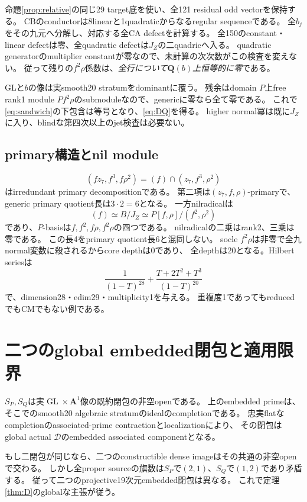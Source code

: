 \documentclass[11pt,a4paper]{ltjsarticle}
\newcommand{\QQ}{\mathbf Q}
\renewcommand{\AA}{\mathbf A}
\newcommand{\cD}{\mathcal D}
\newcommand{\GL}{\operatorname{GL}}
\theoremstyle{definition}
\theoremstyle{remark}
\begin{document}
命題\ref{prop:relative}の同じ29 target底を使い、全121 residual odd vectorを保持する。
CBのconductorは8linearと1quadraticからなるregular sequenceである。
全$b_j$をその九元へ分解し、対応する全CA defectを計算する。
全150のconstant・linear defectは零、全quadratic defectは$J_Z$の二quadricへ入る。
quadratic generatorのmultiplier constantが零なので、未計算の次次数がこの検査を変えない。
従って残りの$f^2\rho$係数は、\emph{全行について$\QQ(b)$上恒等的に零}である。

GLと$b$の像は実smooth20 stratumをdominantに覆う。
残余はdomain $P$上free rank1 module $P f^2\rho$のsubmoduleなので、genericに零なら全て零である。
これで\eqref{eq:sandwich}の下包含は等号となり、\eqref{eq:DQ}を得る。
higher normal冪は既に$J_Z$に入り、blindな第四次以上のjet検査は必要ない。

\subsection{primary構造とnil module}

\[
 (fz_7,f^3,f\rho^2)=(f)\cap(z_7,f^3,\rho^2)
\]
はirredundant primary decompositionである。
第二項は$(z_7,f,\rho)$-primaryで、generic primary quotient長は$3\cdot2=6$となる。
一方nilradicalは
\[
 (f)\simeq B/J_Z\simeq P[f,\rho]/(f^2,\rho^2)
\]
であり、$P$-basisは$f,f^2,f\rho,f^2\rho$の四つである。
nilradicalの二乗はrank2、三乗は零である。
この長4をprimary quotient長6と混同しない。
socle $f^2\rho$は非零で全九normal変数に殺されるからcore depthは0であり、
全depthは20となる。Hilbert seriesは
\[
 \frac1{(1-T)^{28}}+\frac{T+2T^2+T^3}{(1-T)^{20}}
\]
で、dimension28・edim29・multiplicity1を与える。
重複度1であってもreducedでもCMでもない例である。

\section{二つのglobal embedded閉包と適用限界}

$S_P,S_Q$は実$\GL\times\AA^1$像の既約閉包の非空openである。
上のembedded primeは、そこでのsmooth20 algebraic stratumのidealのcompletionである。
忠実flatなcompletionのassociated-prime contractionとlocalizationにより、
その閉包はglobal actual $\cD$のembedded associated componentとなる。

もし二閉包が同じなら、二つのconstructible dense imageはその共通の非空openで交わる。
しかし全proper sourceの旗数は$S_P$で$(2,1)$、$S_Q$で$(1,2)$であり矛盾する。
従って二つのprojective19次元embedded閉包は異なる。
これで定理\ref{thm:D}のglobalな主張が従う。
\end{document}
